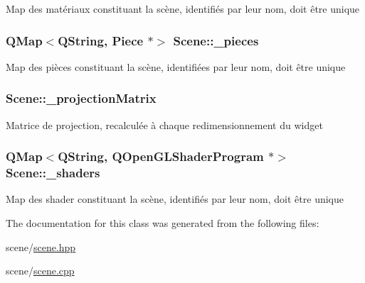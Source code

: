 Map des matériaux constituant la scène, identifiés par leur nom, doit être unique \hypertarget{class_scene_aa3a488d4be41fe6a187488e1e7a1035c}{
\subsubsection[{\+\_\+pieces}]{\setlength{\rightskip}{0pt plus 5cm}Q\+Map$<$Q\+String, {\bf Piece} $\ast$$>$ Scene\+::\+\_\+pieces\hspace{0.3cm}{\ttfamily [private]}}}\label{class_scene_aa3a488d4be41fe6a187488e1e7a1035c}
Map des pièces constituant la scène, identifiées par leur nom, doit être unique \hypertarget{class_scene_a7db3394191c0a07e6bdc456a53ac8ece}{
\subsubsection[{\+\_\+projection\+Matrix}]{ Scene\+::\+\_\+projection\+Matrix\hspace{0.3cm}{\ttfamily [private]}}}\label{class_scene_a7db3394191c0a07e6bdc456a53ac8ece}
Matrice de projection, recalculée à chaque redimensionnement du widget \hypertarget{class_scene_abde34dc03c8d3a07b3177041ab195f07}{
\subsubsection[{\+\_\+shaders}]{\setlength{\rightskip}{0pt plus 5cm}Q\+Map$<$Q\+String, Q\+Open\+G\+L\+Shader\+Program $\ast$$>$ Scene\+::\+\_\+shaders\hspace{0.3cm}{\ttfamily [private]}}}\label{class_scene_abde34dc03c8d3a07b3177041ab195f07}
Map des shader constituant la scène, identifiés par leur nom, doit être unique 

The documentation for this class was generated from the following files\+:\begin{DoxyCompactItemize}
\item 
scene/\hyperlink{scene_8hpp}{scene.\+hpp}\item 
scene/\hyperlink{scene_8cpp}{scene.\+cpp}\end{DoxyCompactItemize}
